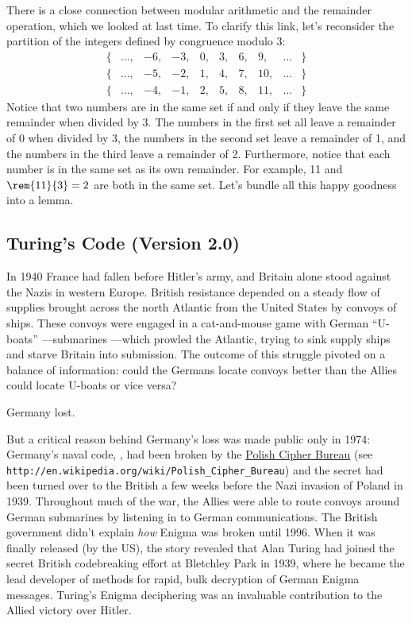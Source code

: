 \begin{editingnotes}

There is a close connection between modular arithmetic and the
remainder operation, which we looked at last time.  To clarify this
link, let's reconsider the partition of the integers defined by
congruence modulo 3:
%
\[
\begin{array}{cccccccccc}
\{ & \dots, & -6, & -3, & 0, & 3, & 6, & 9, & \dots & \} \\
\{ & \dots, & -5, & -2, & 1, & 4, & 7, & 10, & \dots & \} \\
\{ & \dots, & -4, & -1, & 2, & 5, & 8, & 11, & \dots & \}
\end{array}
\]
%
Notice that two numbers are in the same set if and only if they leave
the same remainder when divided by 3.  The numbers in the first set
all leave a remainder of 0 when divided by 3, the numbers in the
second set leave a remainder of 1, and the numbers in the third leave
a remainder of 2.  Furthermore, notice that each number is in the same
set as its own remainder.  For example, 11 and $\rem{11}{3} = 2$ are
both in the same set.  Let's bundle all this happy goodness into a
lemma.

\end{editingnotes}


\subsection{Turing's Code (Version 2.0)}

In 1940 France had fallen before Hitler's army, and Britain alone stood
against the Nazis in western Europe.  British resistance depended on a
steady flow of supplies brought across the north Atlantic from the United
States by convoys of ships.  These convoys were engaged in a cat-and-mouse
game with German ``U-boats'' ---submarines ---which prowled the Atlantic,
trying to sink supply ships and starve Britain into submission.  The
outcome of this struggle pivoted on a balance of information: could the
Germans locate convoys better than the Allies could locate U-boats or vice
versa?

Germany lost.

But a critical reason behind Germany's loss was made public only in
1974: Germany's naval code, , had been broken by
the \href{http://en.wikipedia.org/wiki/Polish_Cipher_Bureau}{Polish
Cipher Bureau}
(see \texttt{http://en.wikipedia.org/wiki/Polish\_Cipher\_Bureau}) and
the secret had been turned over to the British a few weeks before the
Nazi invasion of Poland in 1939.  Throughout much of the war, the
Allies were able to route convoys around German submarines by
listening in to German communications.  The British government didn't
explain \emph{how} Enigma was broken until 1996.  When it was finally
released (by the US), the story revealed that Alan Turing had joined
the secret British codebreaking effort at Bletchley Park in 1939,
where he became the lead developer of methods for rapid, bulk
decryption of German Enigma messages.  Turing's Enigma deciphering was
an invaluable contribution to the Allied victory over Hitler.


